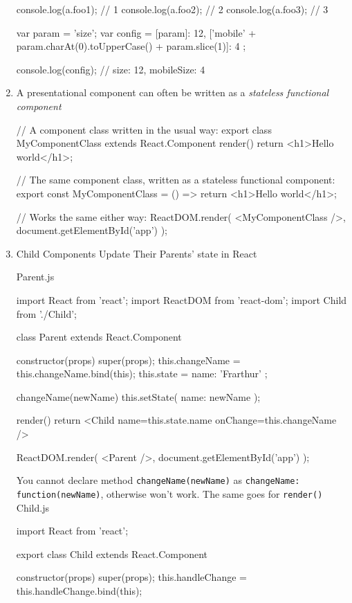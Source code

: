 \documentclass[a4paper,12pt]{article}
\begin{document}
\begin{enumerate}
\begin{jscode}
console.log(a.foo1); // 1
console.log(a.foo2); // 2
console.log(a.foo3); // 3

var param = 'size';
var config = {
  [param]: 12,
  ['mobile' + param.charAt(0).toUpperCase() + param.slice(1)]: 4
};

console.log(config); // {size: 12, mobileSize: 4}
\end{jscode}

\item A presentational component can often be written as a \textit{stateless functional component}

\begin{jscode}
// A component class written in the usual way:
export class MyComponentClass extends React.Component {
  render() {
    return <h1>Hello world</h1>;
  }
}

// The same component class, written as a stateless functional component:
export const MyComponentClass = () => {
  return <h1>Hello world</h1>;
}

// Works the same either way:
ReactDOM.render(
	<MyComponentClass />,
	document.getElementById('app')
);
\end{jscode}

\item Child Components Update Their Parents' state in React

Parent.js
\begin{jscode}
import React from 'react';
import ReactDOM from 'react-dom';
import { Child } from './Child';

class Parent extends React.Component {
  constructor(props) {
    super(props);
    this.changeName = this.changeName.bind(this);
    this.state = { name: 'Frarthur' };
  }
  
  changeName(newName) {
    this.setState({ name: newName });
  }

  render() {
    return <Child name={this.state.name} onChange={this.changeName} />
  }
}

ReactDOM.render(
	<Parent />,
	document.getElementById('app')
);
\end{jscode}
You cannot declare method \verb|changeName(newName)| as \verb|changeName: function(newName)|, otherwise won't work. The same goes for \verb|render()|\\


Child.js
\begin{jscode}
import React from 'react';

export class Child extends React.Component {
  constructor(props) {
    super(props);
    this.handleChange = this.handleChange.bind(this);
  }
  
}
\end{jscode}
\end{enumerate}
\end{document}

